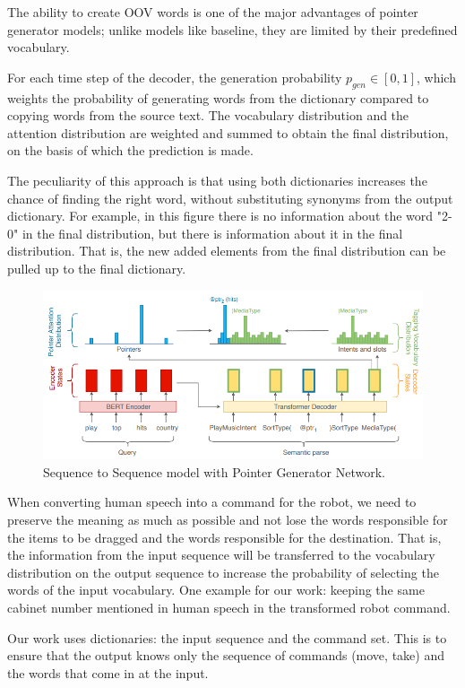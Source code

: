 \documentclass{article}
\begin{document}
The ability to create OOV words is one of the major advantages of pointer generator models; unlike models like baseline, they are limited by their predefined vocabulary.

For each time step of the decoder, the generation probability $p_{gen} \in [0,1]$, which weights the probability of generating words from the dictionary compared to copying words from the source text. The vocabulary distribution and the attention distribution are weighted and summed to obtain the final distribution, on the basis of which the prediction is made. 

The peculiarity of this approach is that using both dictionaries increases the chance of finding the right word, without substituting synonyms from the output dictionary. For example, in this figure there is no information about the word "2-0" in the final distribution, but there is information about it in the final distribution. That is, the new added elements from the final distribution can be pulled up to the final dictionary.

\begin{figure}[!tbh]
    \centering
    \includegraphics[width=0.9\linewidth]{Sem_parce.png}
    \caption{Sequence to Sequence model with Pointer Generator Network.}
    \label{fig:sem_parce}
\end{figure}

When converting human speech into a command for the robot, we need to preserve the meaning as much as possible and not lose the words responsible for the items to be dragged and the words responsible for the destination. That is, the information from the input sequence will be transferred to the vocabulary distribution on the output sequence to increase the probability of selecting the words of the input vocabulary. One example for our work: keeping the same cabinet number mentioned in human speech in the transformed robot command.

Our work uses dictionaries: the input sequence and the command set. This is to ensure that the output knows only the sequence of commands (move, take) and the words that come in at the input.
\end{document}

